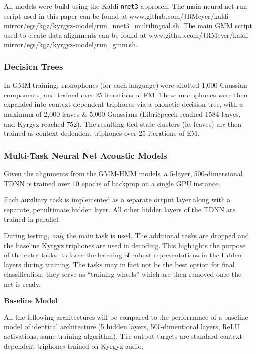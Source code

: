 \documentclass[a4paper]{article}
\begin{document}
All models were build using the Kaldi \texttt{nnet3} approach. The main neural net run script used in this paper can be found at www.github.com/JRMeyer/kaldi-mirror/egs/kgz/kyrgyz-model/run\_nnet3\_multilingual.sh. The main GMM script used to create data alignments can be found at www.github.com/JRMeyer/kaldi-mirror/egs/kgz/kyrgyz-model/run\_gmm.sh.

\subsubsection{Decision Trees}

In GMM training, monophones (for each language) were allotted 1,000 Gaussian components, and trained over 25 iterations of EM. These monophones were then expanded into context-dependent triphones via a phonetic decision tree, with a maximum of 2,000 leaves \& 5,000 Gaussians (LibriSpeech reached 1584 leaves, and Kyrgyz reached 752). The resulting tied-state clusters (ie. leaves) are then trained as context-dedendent triphones over 25 iterations of EM.


\subsubsection{Multi-Task Neural Net Acoustic Models}

Given the alignments from the GMM-HMM models, a 5-layer, 500-dimensional TDNN is trained over 10 epochs of backprop on a single GPU instance.

Each auxiliary task is implemented as a separate output layer along with a separate, penultimate hidden layer. All other hidden layers of the TDNN are trained in parallel.

During testing, \textit{only} the main task is used. The additional tasks are dropped and the baseline Kyrgyz triphones are used in decoding. This highlights the purpose of the extra tasks: to force the learning of robust representations in the hidden layers during training. The tasks may in fact not be the best option for final classification; they serve as ``training wheels'' which are then removed once the net is ready.



\textbf{Baseline Model}

All the following architectures will be compared to the performance of a baseline model of identical architecture (5 hidden layers, 500-dimentional layers, ReLU activations, same training algorithm). The output targets are standard context-dependent triphones trained on Kyrgyz audio.
\end{document}
